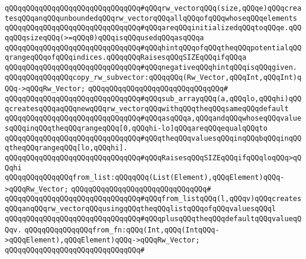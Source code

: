 \verb|qQQqqQQqqQQqqQQqqQQqqQQqqQQqqQQq#qQQqrw_vectorqQQq(size,qQQqe)qQQqcreatesqQQqanqQQqunboundedqQQqrw_vectorqQQqallqQQqofqQQqwhoseqQQqelements|\newline
\verb|qQQqqQQqqQQqqQQqqQQqqQQqqQQqqQQq#qQQqareqQQqinitializedqQQqtoqQQqe.qQQqqQQqsizeqQQq(>=qQQq0)qQQqisqQQqusedqQQqasqQQqa|\newline
\verb|qQQqqQQqqQQqqQQqqQQqqQQqqQQqqQQq#qQQqhintqQQqofqQQqtheqQQqpotentialqQQqrangeqQQqofqQQqindices.qQQqqQQqRaisesqQQqSIZEqQQqifqQQqa|\newline
\verb|qQQqqQQqqQQqqQQqqQQqqQQqqQQqqQQq#qQQqnegativeqQQqhintqQQqisqQQqgiven.|\newline
\newline
\newline
\verb|qQQqqQQqqQQqqQQqcopy_rw_subvector:qQQqqQQq(Rw_Vector,qQQqInt,qQQqInt)qQQq->qQQqRw_Vector;|\newline
\verb|qQQqqQQqqQQqqQQqqQQqqQQqqQQqqQQq#|\newline
\verb|qQQqqQQqqQQqqQQqqQQqqQQqqQQqqQQq#qQQqsub_arrayqQQq(a,qQQqlo,qQQqhi)qQQqcreatesqQQqaqQQqnewqQQqrw_vectorqQQqwithqQQqtheqQQqsameqQQqdefault|\newline
\verb|qQQqqQQqqQQqqQQqqQQqqQQqqQQqqQQq#qQQqasqQQqa,qQQqandqQQqwhoseqQQqvaluesqQQqinqQQqtheqQQqrangeqQQq[0,qQQqhi-lo]qQQqareqQQqequalqQQqto|\newline
\verb|qQQqqQQqqQQqqQQqqQQqqQQqqQQqqQQq#qQQqtheqQQqvaluesqQQqinqQQqbqQQqinqQQqtheqQQqrangeqQQq[lo,qQQqhi].|\newline
\verb|qQQqqQQqqQQqqQQqqQQqqQQqqQQqqQQq#qQQqRaisesqQQqSIZEqQQqifqQQqloqQQq>qQQqhi|\newline
\newline
\newline
\verb|qQQqqQQqqQQqqQQqfrom_list:qQQqqQQq(List(Element),qQQqElement)qQQq->qQQqRw_Vector;|\newline
\verb|qQQqqQQqqQQqqQQqqQQqqQQqqQQqqQQq#|\newline
\verb|qQQqqQQqqQQqqQQqqQQqqQQqqQQqqQQq#qQQqfrom_listqQQq(l,qQQqv)qQQqcreatesqQQqanqQQqrw_vectorqQQqusingqQQqtheqQQqlistqQQqofqQQqvaluesqQQql|\newline
\verb|qQQqqQQqqQQqqQQqqQQqqQQqqQQqqQQq#qQQqplusqQQqtheqQQqdefaultqQQqvalueqQQqv.|\newline
\newline
\newline
\verb|qQQqqQQqqQQqqQQqfrom_fn:qQQq(Int,qQQq(IntqQQq->qQQqElement),qQQqElement)qQQq->qQQqRw_Vector;|\newline
\verb|qQQqqQQqqQQqqQQqqQQqqQQqqQQqqQQq#|\newline
